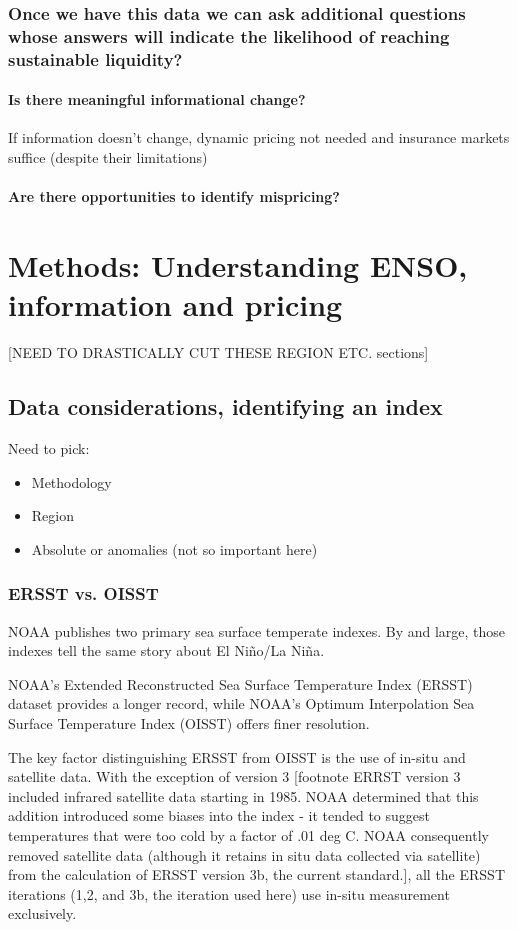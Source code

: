 \documentclass[authoryear]{article}
\begin{document}
\subsubsection{Once we have this data we can ask additional questions whose answers will indicate the likelihood of reaching sustainable liquidity?}

\paragraph{Is there meaningful informational change?}
If information doesn't change, dynamic pricing not needed and insurance markets suffice (despite their limitations)

\paragraph{Are there opportunities to identify mispricing?}


\section{Methods: Understanding ENSO, information and pricing}
[NEED TO DRASTICALLY CUT THESE REGION ETC. sections]
\subsection{Data considerations, identifying an index}
Need to pick:
\begin{itemize}
\item Methodology
\item Region
\item Absolute or anomalies (not so important here)
\end{itemize}

\subsubsection{ERSST vs. OISST}

NOAA publishes two primary sea surface temperate indexes. By and large, those indexes tell the same story about El Ni\~no/La Ni\~na.

NOAA's Extended Reconstructed Sea Surface Temperature Index (ERSST) dataset provides a longer record, while NOAA's Optimum Interpolation Sea Surface Temperature Index (OISST) offers finer resolution. 

The key factor distinguishing ERSST from OISST is the use of in-situ and satellite data. With the exception of version 3 [footnote ERRST version 3 included infrared satellite data starting in 1985. NOAA determined that this addition introduced some biases into the index - it tended to suggest temperatures that were too cold by a factor of .01 deg C. NOAA consequently removed satellite data (although it retains in situ data collected via satellite) from the calculation of ERSST version 3b, the current standard.], all the ERSST iterations (1,2, and 3b, the iteration used here) use in-situ measurement exclusively\cite{smith2004improved}\cite{smith2003extended}\cite{smith2008improvements}.
\end{document}
